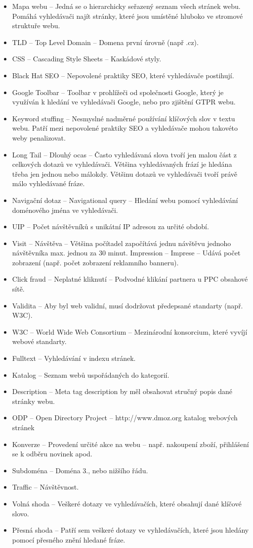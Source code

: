 \begin{itemize}
\item Mapa webu – Jedná se o hierarchicky seřazený seznam všech stránek webu. Pomáhá vyhledávači najít stránky, které jsou umístěné hluboko ve stromové struktuře webu.
\item TLD – Top Level Domain – Domena první úrovně (např .cz).
\item CSS – Cascading Style Sheets – Kaskádové styly.
\item Black Hat SEO – Nepovolené praktiky SEO, které vyhledávače postihují.
\item Google Toolbar – Toolbar v prohlížeči od společnosti Google, který je využíván k hledání ve vyhledávači Google, nebo pro zjištění GTPR webu.
\item Keyword stuffing – Nesmyslné nadměrné používání klíčových slov v textu webu. Patří mezi nepovolené praktiky SEO a vyhledávače mohou takovéto weby penalizovat.
\item Long Tail – Dlouhý ocas – Často vyhledávaná slova tvoří jen malou část z celkových dotazů ve vyhledávači. Většina vyhledávaných frází je hledána třeba jen jednou nebo málokdy. Většinu dotazů ve vyhledávači tvoří právě málo vyhledávané fráze.
\item Navigační dotaz – Navigational query – Hledání webu pomocí vyhledávání doménového jména ve vyhledávači.
\item UIP – Počet návštěvníků s unikátní IP adresou za určité období.
\item Visit – Návštěva – Většina počítadel započítává jednu návštěvu jednoho návštěvníka max. jednou za 30 minut. Impression – Imprese – Udává počet zobrazení (např. počet zobrazení reklamního banneru).
\item Click fraud – Neplatné kliknutí – Podvodné klikání partnera u PPC obsahové sítě.
\item Validita – Aby byl web validní, musí dodržovat předepsané standarty (např. W3C).
\item W3C – World Wide Web Consortium – Mezinárodní konsorcium, které vyvíjí webové standarty.
\item Fulltext – Vyhledávání v indexu stránek.
\item Katalog – Seznam webů uspořádaných do kategorií.
\item Description – Meta tag description by měl obsahovat stručný popis dané stránky webu.
\item ODP – Open Directory Project – http://www.dmoz.org katalog webových stránek
\item Konverze – Provedení určité akce na webu – např. nakoupení zboží, přihlášení se k odběru novinek apod.
\item Subdoména – Doména 3., nebo nižšího řádu.
\item Traffic – Návštěvnost.
\item Volná shoda – Veškeré dotazy ve vyhledávačích, které obsahují dané klíčové slovo.
\item Přesná shoda – Patří sem veškeré dotazy ve vyhledávačích, které jsou hledány pomocí přesného znění hledané fráze.
\end{itemize}
